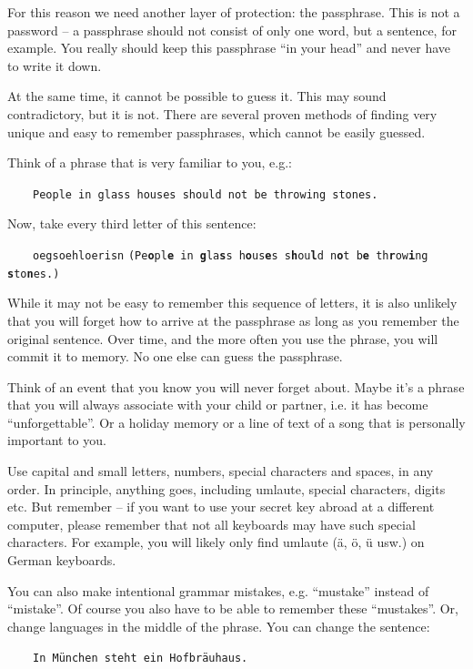 \documentclass[a4paper,11pt,oneside,openright,titlepage]{scrbook}
\begin{document}
For this reason we need another layer of protection: the passphrase.
This is not a password -- a passphrase should not consist of only one
word, but a sentence, for example. You really should keep this
passphrase ``in your head'' and never have to write it down.

At the same time, it cannot be possible to guess it.  This may sound
contradictory, but it is not. There are several proven methods of
finding very unique and easy to remember passphrases, which cannot be
easily guessed.

\clearpage
Think of a phrase that is very familiar to you, e.g.:

$\qquad$\verb-People in glass houses should not be throwing stones.-

Now, take every third letter of this sentence:

$\qquad$\verb-oegsoehloerisn-
\texttt{\scriptsize{(Pe\textbf{o}pl\textbf{e} in
\textbf{g}la\textbf{s}s h\textbf{o}us\textbf{e}s
s\textbf{h}ou\textbf{l}d n\textbf{o}t b\textbf{e}
th\textbf{r}ow\textbf{i}ng \textbf{s}to\textbf{n}es.)}}


While it may not be easy to remember
this sequence of letters, it is also unlikely that you will forget how
to arrive at the passphrase as long as you remember the original
sentence. Over time, and the more often you use the phrase, you will
commit it to memory. No one else can guess the passphrase.

Think of an event that you know you will never forget about. Maybe
it's a phrase that you will always associate with your child or
partner, i.e. it has become ``unforgettable''.  Or a holiday memory or
a line of text of a song that is personally important to you.

Use capital and small letters, numbers, special characters and spaces,
in any order. In principle, anything goes, including umlaute, special
characters, digits etc. But remember -- if you want to use your secret
key abroad at a different computer, please remember that not all
keyboards may have such special characters. For example, you will
likely only find umlaute (ä, ö, ü usw.) on German keyboards.

You can also make intentional grammar mistakes, e.g.  ``mustake''
instead of ``mistake''. Of course you also have to be able to remember
these ``mustakes''. Or, change languages in the middle of the phrase.
You can change the sentence:

$\qquad$\verb-In München steht ein Hofbräuhaus.-
\end{document}
